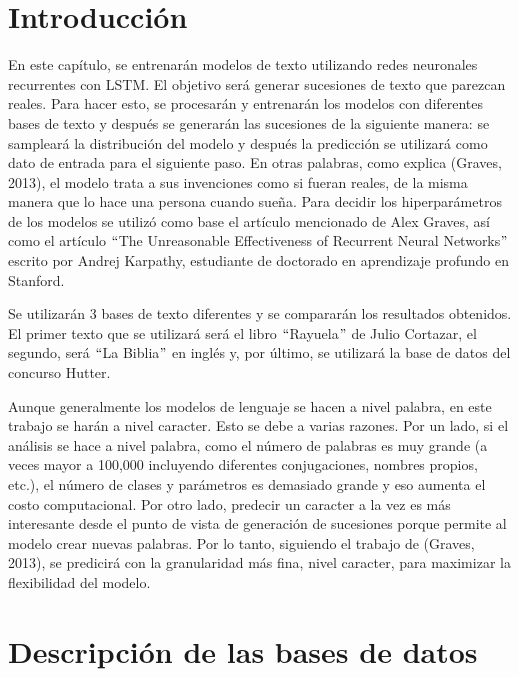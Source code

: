 \section{Introducción}
En este capítulo, se entrenarán modelos de texto utilizando redes neuronales recurrentes con LSTM. El objetivo será generar sucesiones de texto que parezcan reales. Para hacer esto, se procesarán y entrenarán los modelos con diferentes bases de texto y después se generarán las sucesiones de la siguiente manera: se sampleará la distribución del modelo y después la predicción se utilizará como dato de entrada para el siguiente paso. En otras palabras, como explica (Graves, 2013), el modelo trata a sus invenciones como si fueran reales, de la misma manera que lo hace una persona cuando sueña. Para decidir los hiperparámetros de los modelos se utilizó como base el artículo mencionado de Alex Graves, así como el artículo $``$The Unreasonable Effectiveness of Recurrent Neural Networks$"$ escrito por Andrej Karpathy, estudiante de doctorado en aprendizaje profundo en Stanford.
\cite{DBLP:journals/corr/Graves13}
\cite{unreasonable}

\vspace{1em}

Se utilizarán 3 bases de texto diferentes y se compararán los resultados obtenidos. El primer texto que se utilizará será el libro $``$Rayuela$"$ de Julio Cortazar, el segundo, será $``$La Biblia$"$ en inglés y, por último, se utilizará la base de datos del concurso Hutter.

\vspace{1em}

Aunque generalmente los modelos de lenguaje se hacen a nivel palabra, en este trabajo se harán a nivel caracter. Esto se debe a varias razones. Por un lado, si el análisis se hace a nivel palabra, como el número de palabras es muy grande (a veces mayor a 100,000 incluyendo diferentes conjugaciones, nombres propios, etc.), el número de clases y parámetros es demasiado grande y eso aumenta el costo computacional. Por otro lado, predecir un caracter a la vez es más interesante desde el punto de vista de generación de sucesiones porque permite al modelo crear nuevas palabras. Por lo tanto, siguiendo el trabajo de (Graves, 2013), se predicirá con la granularidad más fina, nivel caracter, para maximizar la flexibilidad del modelo.
\cite{DBLP:journals/corr/Graves13}

\section{Descripción de las bases de datos}

